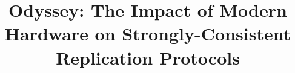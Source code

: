 \documentclass[sigplan, screen]{acmart}
\begin{document}
\title[Odyssey: The Impact of Modern Hardware on Replication Protocols ]{ Odyssey: The Impact of Modern Hardware on Strongly-Consistent Replication Protocols}

\date{}


\maketitle
\thispagestyle{empty}








% 








%
%

%
%




% 
\end{document}
